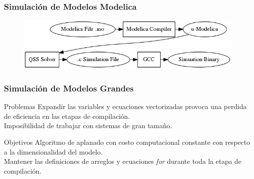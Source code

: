 \documentclass[aspectratio=169,10pt]{beamer}
\begin{document}
\begin{frame}[fragile]
\frametitle{Simulación de Modelos Modelica} 
    \begin{figure}
      \centering
      \includegraphics[scale=0.5]{Compilacion} 
      \label{fig:proceso}
    \end{figure}
\end{frame}



\begin{frame}[fragile]
\frametitle{Simulación de Modelos Grandes} 
\begin{block}{Problemas}
Expandir las variables y ecuaciones vectorizadas provoca una perdida de eficiencia en las etapas de compilación. \\
Imposibilidad de trabajar con sistemas de gran tamaño.
\end{block} 

\begin{block}{Objetivos}
Algoritmo de aplanado con costo computacional constante con respecto a la dimensionalidad del modelo. \\
Mantener las definiciones de arreglos y ecuaciones \textit{for} durante toda la etapa de compilación.
\end{block} 

\end{frame}




\end{document}
